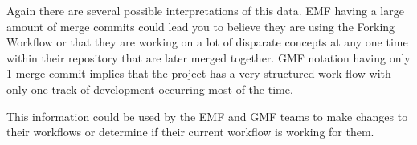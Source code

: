 \documentclass[runningheads,a4paper]{llncs}
\begin{document}
Again there are several possible interpretations of this data. EMF having a large amount of merge commits could lead you to believe they are using the Forking Workflow \cite{gitcomparingworkflows} or that they are working on a lot of disparate concepts at any one time within their repository that are later merged together. GMF notation having only 1 merge commit implies that the project has a very structured work flow with only one track of development occurring most of the time.

This information could be used by the EMF and GMF teams to make changes to their workflows or determine if their current workflow is working for them. 

\end{document}
